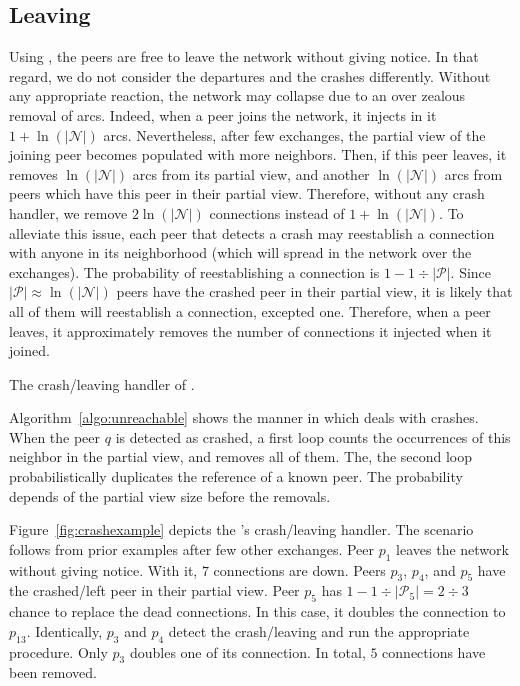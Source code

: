 \subsection{Leaving}
\label{subsec:leaving}

Using \SPRAY, the peers are free to leave the network without giving notice. In
that regard, we do not consider the departures and the crashes differently.
Without any appropriate reaction, the network may collapse due to an over
zealous removal of arcs. Indeed, when a peer joins the network, it injects in
it $1+\ln(|\mathcal{N}|)$ arcs. Nevertheless, after few exchanges, the partial
view of the joining peer becomes populated with more neighbors. Then, if this
peer leaves, it removes $\ln(|\mathcal{N}|)$ arcs from its partial view, and
another $\ln(|\mathcal{N}|)$ arcs from peers which have this peer in their
partial view. Therefore, without any crash handler, we remove
$2\ln(|\mathcal{N}|)$ connections instead of $1+\ln(|\mathcal{N}|)$. To
alleviate this issue, each peer that detects a crash may reestablish a
connection with anyone in its neighborhood (which will spread in the network
over the exchanges). The probability of reestablishing a connection is
$1-{1\div{|\mathcal{P}|}}$. Since ${|\mathcal{P}|}\approx \ln(|\mathcal{N}|)$
peers have the crashed peer in their partial view, it is likely that all of
them will reestablish a connection, excepted one. Therefore, when a peer
leaves, it approximately removes the number of connections it injected when it
joined.

\begin{algorithm}[h]
  
  \caption{\label{algo:unreachable}The crash/leaving handler of \SPRAY.}
\end{algorithm}

Algorithm~\ref{algo:unreachable} shows the manner in which \SPRAY deals with
crashes. When the peer $q$ is detected as crashed, a first loop counts the
occurrences of this neighbor in the partial view, and removes all of them. The,
the second loop probabilistically duplicates the reference of a known peer. The
probability depends of the partial view size before the removals.

Figure~\ref{fig:crashexample} depicts the \SPRAY's crash/leaving
handler. The scenario follows from prior examples after few other
exchanges. Peer $p_1$ leaves the network without giving notice. With
it, $7$ connections are down. Peers $p_3$, $p_4$, and $p_5$ have the
crashed/left peer in their partial view. Peer $p_5$ has
$1-{1\div{|\mathcal{P}_5|}}={2\div{3}}$ chance to replace the dead
connections. In this case, it doubles the connection to
$p_{13}$. Identically, $p_3$ and $p_4$ detect the crash/leaving and
run the appropriate procedure. Only $p_3$ doubles one of its
connection. In total, $5$ connections have been removed.  

